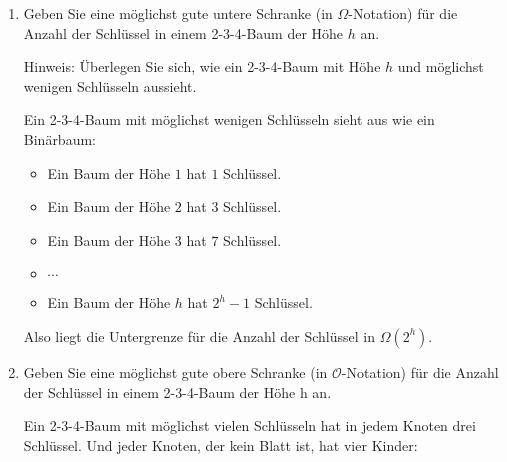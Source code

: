 \documentclass{bschlangaul-aufgabe}
\begin{document}
\begin{enumerate}
\begin{bAntwort}
\begin{bBaum}{Nach dem Einfügen von „6“}
\end{bBaum}
\end{bAntwort}


\item Geben Sie eine möglichst gute untere Schranke (in
$\Omega$-Notation) für die Anzahl der Schlüssel in einem 2-3-4-Baum der
Höhe $h$ an.

Hinweis: Überlegen Sie sich, wie ein 2-3-4-Baum mit Höhe $h$ und
möglichst wenigen Schlüsseln aussieht.

\begin{bAntwort}
Ein 2-3-4-Baum mit möglichst wenigen Schlüsseln sieht aus wie ein
Binärbaum:

\begin{itemize}
\item Ein Baum der Höhe $1$ hat $1$ Schlüssel.
\item Ein Baum der Höhe $2$ hat $3$ Schlüssel.
\item Ein Baum der Höhe $3$ hat $7$ Schlüssel.
\item $\cdots$
\item Ein Baum der Höhe $h$ hat $2^h - 1$ Schlüssel.
\end{itemize}

Also liegt die Untergrenze für die Anzahl der Schlüssel in
$\Omega(2^h)$.
\end{bAntwort}


\item Geben Sie eine möglichst gute obere Schranke (in
$\mathcal{O}$-Notation) für die Anzahl der Schlüssel in einem 2-3-4-Baum
der Höhe h an.

\begin{bAntwort}
Ein 2-3-4-Baum mit möglichst vielen Schlüsseln hat in jedem Knoten drei
Schlüssel. Und jeder Knoten, der kein Blatt ist, hat vier Kinder:


\end{bAntwort}
\end{enumerate}
\end{document}
